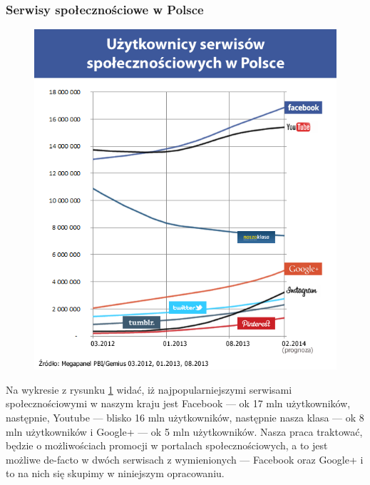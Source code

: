 
\subsubsection{Serwisy społecznościowe w Polsce}

\begin{figure}[!h]
\centering
    \scalebox{0.5}
    {
        \includegraphics{images/lukasz/analiza.png}
    }
    \label{fig:uzytkownicy-mediow-spolecznosciowych-w-polsce}
\end{figure}


Na wykresie z rysunku \ref{fig:uzytkownicy-mediow-spolecznosciowych-w-polsce} widać, iż najpopularniejszymi serwisami społecznościowymi w naszym kraju jest Facebook --- ok 17 mln użytkowników, następnie, Youtube --- blisko 16 mln użytkowników, następnie nasza klasa --- ok 8 mln użytkowników i Google+ --- ok 5 mln użytkowników.
Nasza praca traktować, będzie o możliwościach promocji w portalach społecznościowych, a to jest możliwe de-facto w dwóch serwisach z wymienionych --- Facebook oraz Google+ i to na nich się skupimy w niniejszym opracowaniu.

